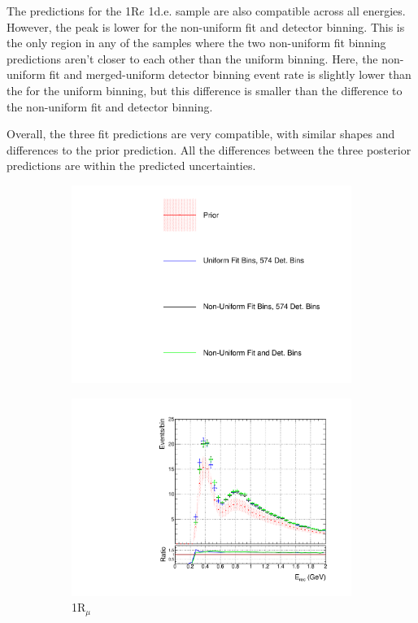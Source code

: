The predictions for the 1R$e$ 1d.e. sample are also compatible across all energies. However, the peak is lower for the non-uniform fit and detector binning. This is the only region in any of the samples where the two non-uniform fit binning predictions aren't closer to each other than the uniform binning. Here, the non-uniform fit and merged-uniform detector binning event rate is slightly lower than the for the uniform binning, but this difference is smaller than the difference to the non-uniform fit and detector binning. 

Overall, the three fit predictions are very compatible, with similar shapes and differences to the prior prediction. All the differences between the three posterior predictions are within the predicted uncertainties.

\begin{figure}
\centering
\begin{subfigure}{.95\textwidth}
  \centering
  \includegraphics[width=0.29\linewidth]{figs/polyskspecleg}
\end{subfigure}
\begin{subfigure}{.49\textwidth}
  \centering
  \includegraphics[width=0.95\linewidth]{figs/polySKnumu}
  \caption{1R$_{\mu}$}
  \label{fig:skppnumu}
\end{subfigure}
\begin{subfigure}{.49\textwidth}
  \centering

\end{subfigure}
\end{figure}
